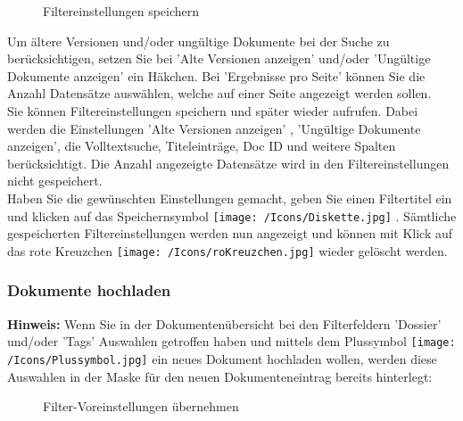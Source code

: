 \begin{figure}[H]
\caption{Filtereinstellungen speichern}
\end{figure}

Um ältere Versionen und/oder ungültige Dokumente bei der Suche zu berücksichtigen, setzen Sie bei 'Alte Versionen anzeigen'  und/oder 'Ungültige Dokumente anzeigen'  ein Häkchen. Bei 'Ergebnisse pro Seite'  können Sie die Anzahl Datensätze auswählen, welche auf einer Seite angezeigt werden sollen.\\
Sie können Filtereinstellungen speichern und später wieder aufrufen. Dabei werden die Einstellungen 'Alte Versionen anzeigen' , 'Ungültige Dokumente anzeigen', die Volltextsuche, Titeleinträge, Doc ID und weitere Spalten berücksichtigt. Die Anzahl angezeigte Datensätze wird in den Filtereinstellungen nicht gespeichert.\\
Haben Sie die gewünschten Einstellungen gemacht, geben Sie einen Filtertitel ein  und klicken auf das Speichernsymbol \texttt{[image: /Icons/Diskette.jpg]} . Sämtliche gespeicherten Filtereinstellungen werden nun angezeigt  und können mit Klick auf das rote Kreuzchen \texttt{[image: /Icons/roKreuzchen.jpg]}  wieder gelöscht werden.


\subsubsection{Dokumente hochladen}
\label{bkm:Ref442863508}\label{bkm:Ref442787515}\label{bkm:Ref442778397}\label{bkm:Ref442770648}\label{bkm:Ref442769978}

\textbf{Hinweis:} Wenn Sie in der Dokumentenübersicht bei den Filterfeldern 'Dossier' und/oder 'Tags' Auswahlen getroffen haben und mittels dem Plussymbol \texttt{[image: /Icons/Plussymbol.jpg]}  ein neues Dokument hochladen wollen, werden diese Auswahlen in der Maske für den neuen Dokumenteneintrag bereits hinterlegt:

\begin{figure}[H]
\caption{Filter-Voreinstellungen übernehmen}
\end{figure}

